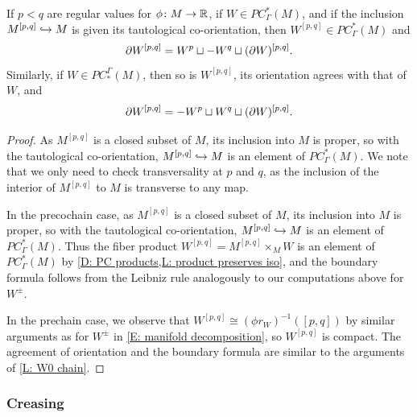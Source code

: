 \begin{lemma}\label{L: Wpq cochain}
	If $p < q$ are regular values for $\phi \colon M \to \mathbb{R}$, if $W \in PC^*_\Gamma(M)$, and if the inclusion $M^{[p,q]} \hookrightarrow M$ is given its tautological co-orientation, then
	$W^{[p,q]} \in PC^*_\Gamma(M)$ and
	$$\partial W^{[p,q]} = W^p \sqcup -W^q \sqcup (\partial W)^{[p,q]}.$$
	Similarly, if $W \in PC_*^\Gamma(M)$, then so is $W^{[p,q]}$, its orientation agrees with that of $W$, and
	$$\partial W^{[p,q]} = -W^p \sqcup W^q \sqcup (\partial W)^{[p,q]}.$$
\end{lemma}
\begin{proof}
	As $M^{[p,q]}$ is a closed subset of $M$, its inclusion into $M$ is proper, so with the tautological co-orientation, $M^{[p,q]} \hookrightarrow M$ is an element of $PC^*_\Gamma(M)$.
	We note that we only need to check transversality at $p$ and $q$, as the inclusion of the interior of $M^{[p,q]}$ to $M$ is transverse to any map.

	In the precochain case, as $M^{[p,q]}$ is a closed subset of $M$, its inclusion into $M$ is proper, so with the tautological co-orientation, $M^{[p,q]} \hookrightarrow M$ is an element of $PC^*_\Gamma(M)$.
	Thus the fiber product $W^{[p,q]} = M^{[p,q]} \times_M W$ is an element of $PC^*_\Gamma(M)$ by \cref{D: PC products,L: product preserves iso}, and the boundary formula follows from the Leibniz rule analogously to our computations above for $W^\pm$.

	In the prechain case, we observe that $W^{[p,q]} \cong (\phi r_W)^{-1}([p,q])$ by similar arguments as for $W^\pm$ in \cref{E: manifold decomposition}, so $W^{[p,q]}$ is compact.
	The agreement of orientation and the boundary formula are similar to the arguments of \cref{L: W0 chain}.
\end{proof}



\subsubsection{Creasing}\label{S: creasing}



